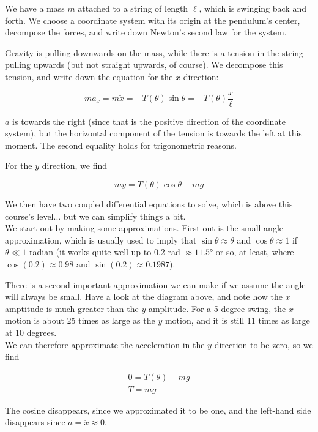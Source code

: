 \documentclass[12pt,a4paper]{report}
\begin{document}
We have a mass $m$ attached to a string of length $\ell$, which is swinging back and forth. We choose a coordinate system with its origin at the pendulum's center, decompose the forces, and write down Newton's second law for the system.

Gravity is pulling downwards on the mass, while there is a tension in the string pulling upwards (but not straight upwards, of course). We decompose this tension, and write down the equation for the $x$ direction:

\begin{equation}
m a_x = m\ddot{x} = - T(\theta) \sin \theta = -T(\theta) \frac{x}{\ell}
\end{equation}

$a$ is towards the right (since that is the positive direction of the coordinate system), but the horizontal component of the tension is towards the left at this moment. The second equality holds for trigonometric reasons.

For the $y$ direction, we find

\begin{equation}
m \ddot{y} = T(\theta) \cos \theta - m g
\end{equation}

We then have two coupled differential equations to solve, which is above this course's level... but we can simplify things a bit.\\
We start out by making some approximations. First out is the small angle approximation, which is usually used to imply that $\sin \theta \approx \theta$ and $\cos \theta \approx 1$ if $\theta \ll 1$ radian (it works quite well up to 0.2 rad $\approx \ang{11.5}$ or so, at least, where $\cos(0.2) \approx 0.98$ and $\sin(0.2) \approx 0.1987$).

There is a second important approximation we can make if we assume the angle will always be small. Have a look at the diagram above, and note how the $x$ amptitude is much greater than the $y$ amplitude. For a 5 degree swing, the $x$ motion is about 25 times as large as the $y$ motion, and it is still 11 times as large at 10 degrees.\\
We can therefore approximate the acceleration in the $y$ direction to be zero, so we find

\begin{align}
0 = T(\theta) - m g\\
T = m g
\end{align}

The cosine disappears, since we approximated it to be one, and the left-hand side disappears since $a = \ddot{x} \approx 0$.
\end{document}
